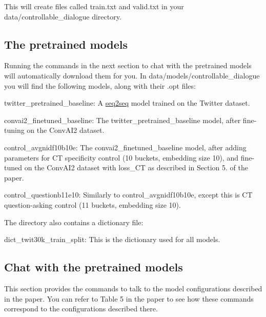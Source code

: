 This will create files called {\ttfamily train.\+txt} and {\ttfamily valid.\+txt} in your {\ttfamily data/controllable\+\_\+dialogue} directory.

\subsection*{The pretrained models}

Running the commands in the next section to chat with the pretrained models will automatically download them for you. In {\ttfamily data/models/controllable\+\_\+dialogue} you will find the following models, along with their {\ttfamily .opt} files\+:


\begin{DoxyItemize}
\item {\ttfamily twitter\+\_\+pretrained\+\_\+baseline}\+: A \hyperlink{namespaceseq2seq}{seq2seq} model trained on the Twitter dataset.
\item {\ttfamily convai2\+\_\+finetuned\+\_\+baseline}\+: The {\ttfamily twitter\+\_\+pretrained\+\_\+baseline} model, after fine-\/tuning on the Conv\+A\+I2 dataset.
\item {\ttfamily control\+\_\+avgnidf10b10e}\+: The {\ttfamily convai2\+\_\+finetuned\+\_\+baseline} model, after adding parameters for CT specificity control (10 buckets, embedding size 10), and fine-\/tuned on the Conv\+A\+I2 dataset with loss\+\_\+\+CT as described in Section 5. of the paper.
\item {\ttfamily control\+\_\+questionb11e10}\+: Similarly to {\ttfamily control\+\_\+avgnidf10b10e}, except this is CT question-\/asking control (11 buckets, embedding size 10).
\end{DoxyItemize}

The directory also contains a dictionary file\+:


\begin{DoxyItemize}
\item {\ttfamily dict\+\_\+twit30k\+\_\+train\+\_\+split}\+: This is the dictionary used for all models.
\end{DoxyItemize}

\subsection*{Chat with the pretrained models}

This section provides the commands to talk to the model configurations described in the paper. You can refer to Table 5 in the paper to see how these commands correspond to the configurations described there.

